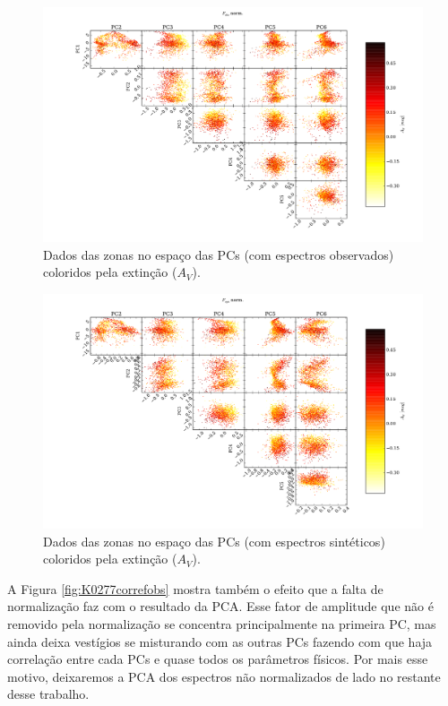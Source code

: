\begin{figure}
	\includegraphics[width=1.3\textwidth, angle=-90]{figuras/K0277-f_obs_norm-corre_PCxPC_AV.pdf}
	\caption[Dados no espaço das PCs vs AV- $f_{obs}$.]
    {Dados das zonas no espaço das PCs (com espectros observados) coloridos pela extinção ($A_V$).}
    \label{fig:K0277correfobsnormPCvsPC:AV}	
\end{figure}

\begin{figure}
	\includegraphics[width=1.3\textwidth, angle=-90]{figuras/K0277-f_syn_norm-corre_PCxPC_AV.pdf}
	\caption[Dados no espaço das PCs vs AV- $f_{syn}$.]
    {Dados das zonas no espaço das PCs (com espectros sintéticos) coloridos pela extinção ($A_V$).}
    \label{fig:K0277correfsynnormPCvsPC:AV}	
\end{figure}

A Figura \ref{fig:K0277correfobs} mostra também o efeito que a falta de normalização faz com o resultado da PCA. Esse
fator de amplitude que não é removido pela normalização se concentra principalmente na primeira PC, mas ainda deixa
vestígios se misturando com as outras PCs fazendo com que haja correlação entre cada PCs e quase todos os parâmetros
físicos. Por mais esse motivo, deixaremos a PCA dos espectros não normalizados de lado no restante desse trabalho.

